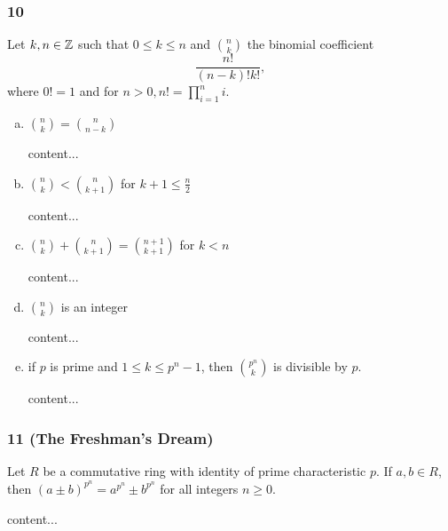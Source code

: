 \subsubsection*{10}
\begin{graybox}
	Let $k,n \in \mathbb{Z}$ such that $0 \leq k \leq n$ and ${n \choose k}$ the binomial coefficient
	$$
		\frac{n!}{(n - k)!k!},
	$$
	where $0! = 1$ and for $n > 0, n! = \prod_{i=1}^{n} i$.
\end{graybox}
\begin{enumerate}[(a)]
	\item 
	\begin{lightgraybox}
		${n \choose k} = {n \choose n-k}$
	\end{lightgraybox}
	\begin{solution}
		content...
	\end{solution}
	
	\item
	\begin{lightgraybox}
		${n \choose k} < {n \choose k + 1}$ for $k + 1 \leq \frac{n}{2}$
	\end{lightgraybox}
	\begin{solution}
		content...
	\end{solution}
	
	\item
	\begin{lightgraybox}
		${n \choose k} + {n \choose k + 1} = {n + 1 \choose k + 1}$ for $k < n$
	\end{lightgraybox}
	\begin{solution}
		content...
	\end{solution}
	
	\item
	\begin{lightgraybox}
		$n \choose k$ is an integer
	\end{lightgraybox}
	\begin{solution}
		content...
	\end{solution}
	
	\item
	\begin{lightgraybox}
		if $p$ is prime and $1 \leq k \leq p^n - 1$, then $p^n \choose k$ is divisible by $p$.
	\end{lightgraybox}
	\begin{solution}
		content...
	\end{solution}
\end{enumerate}

\subsubsection*{11 (The Freshman's Dream)}
\begin{graybox}
	Let $R$ be a commutative ring with identity of prime characteristic $p$. If $a, b \in R$, then $(a \pm b)^{p^n} = a^{p^n} \pm b^{p^n}$ for all integers $n \geq 0$.
\end{graybox}
\begin{solution}
	content...
\end{solution}

